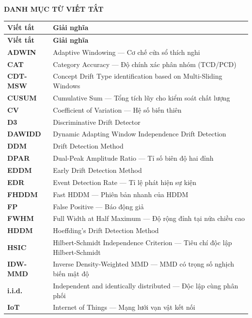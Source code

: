 \newpage
\pagestyle{fancy}

\setcounter{tocdepth}{0}

\begin{center}
    \Large \textbf{DANH MỤC TỪ VIẾT TẮT}
\end{center}

\begin{longtable}[c]{|>{\bfseries}l|p{12cm}|}
	\hline
	\textbf{Viết tắt} & \textbf{Giải nghĩa} \\
	\hline
	\endfirsthead
	\hline
	\textbf{Viết tắt} & \textbf{Giải nghĩa} \\
	\hline
	\endhead
	\hline
	\endfoot
	ADWIN & Adaptive Windowing --- Cơ chế cửa sổ thích nghi \\
	CAT & Category Accuracy --- Độ chính xác phân nhóm (TCD/PCD) \\
	CDT-MSW & Concept Drift Type identification based on Multi-Sliding Windows \\
	CUSUM & Cumulative Sum --- Tổng tích lũy cho kiểm soát chất lượng \\
	CV & Coefficient of Variation --- Hệ số biến thiên \\
	D3 & Discriminative Drift Detector \\
	DAWIDD & Dynamic Adapting Window Independence Drift Detection \\
	DDM & Drift Detection Method \\
	DPAR & Dual-Peak Amplitude Ratio --- Tỉ số biên độ hai đỉnh \\
	EDDM & Early Drift Detection Method \\
	EDR & Event Detection Rate --- Tỉ lệ phát hiện sự kiện \\
	FHDDM & Fast HDDM --- Phiên bản nhanh của HDDM \\
	FP & False Positive --- Báo động giả \\
	FWHM & Full Width at Half Maximum --- Độ rộng đỉnh tại nửa chiều cao \\
	HDDM & Hoeffding's Drift Detection Method \\
	HSIC & Hilbert-Schmidt Independence Criterion --- Tiêu chí độc lập Hilbert-Schmidt \\
	IDW-MMD & Inverse Density-Weighted MMD --- MMD có trọng số nghịch biến mật độ \\
	i.i.d. & Independent and identically distributed --- Độc lập cùng phân phối \\
	IoT & Internet of Things --- Mạng lưới vạn vật kết nối \\

\end{longtable}
